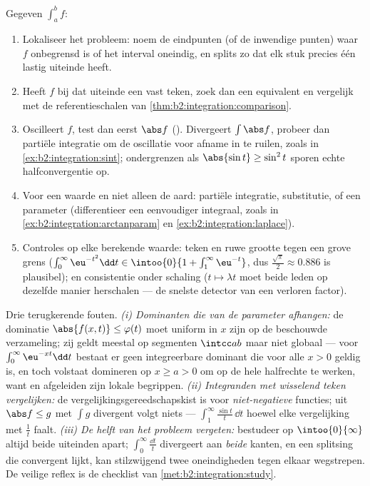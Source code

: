 \begin{method}\label{met:b2:integration:study}
Gegeven $\int_a^b f$:
\begin{enumerate}
  \item Lokaliseer het probleem: noem de eindpunten (of de
        inwendige punten) waar $f$ onbegrensd is of het interval
        oneindig, en splits zo dat elk stuk precies één lastig
        uiteinde heeft.
  \item Heeft $f$ bij dat uiteinde een vast teken, zoek dan een
        equivalent en vergelijk met de referentieschalen van
        \cref{thm:b2:integration:comparison}.
  \item Oscilleert $f$, test dan eerst $\abs f$ (). Divergeert $\int\abs f$, probeer dan
        partiële integratie om de oscillatie voor afname in te
        ruilen, zoals in \cref{ex:b2:integration:sint};
        ondergrenzen als $\abs{\sin t} \geq \sin^2t$ sporen echte
        halfconvergentie op.
  \item Voor een waarde en niet alleen de aard: partiële
        integratie, substitutie, of een parameter (differentieer
        een eenvoudiger integraal, zoals in
        \cref{ex:b2:integration:arctanparam} en
        \cref{ex:b2:integration:laplace}).
  \item Controles op elke berekende waarde: teken en ruwe grootte
        tegen een grove grens ($\int_0^\infty \eu^{-t^2}\dd t \in
        \intoo{0}{1 + \int_1^\infty \eu^{-t}}$, dus
        $\frac{\sqrt\pi}{2} \approx 0.886$ is plausibel); en
        consistentie onder schaling ($t \mapsto \lambda t$ moet
        beide leden op dezelfde manier herschalen --- de snelste
        detector van een verloren factor).
\end{enumerate}
\end{method}

\begin{remark}
Drie terugkerende fouten. \emph{(i) Dominanten die van de parameter
afhangen:} de dominatie $\abs{f(x,t)} \leq \varphi(t)$ moet uniform
in $x$ zijn op de beschouwde verzameling; zij geldt meestal op
segmenten $\intcc ab$ maar niet globaal --- voor
$\int_0^\infty\eu^{-xt}\dd t$ bestaat er geen integreerbare
dominant die voor alle $x > 0$ geldig is, en toch volstaat
domineren op $x \geq a > 0$ om op de hele  halfrechte te
werken, want  en afgeleiden zijn lokale begrippen.
\emph{(ii) Integranden met wisselend teken vergelijken:} de
vergelijkingsgereedschapskist is voor \emph{niet-negatieve}
functies; uit $\abs f \leq g$ met $\int g$ divergent volgt niets
--- $\int_1^\infty\frac{\sin t}t\,\dd t$  hoewel elke
vergelijking met $\frac1t$ faalt. \emph{(iii) De helft van het
probleem vergeten:} bestudeer op $\intoo{0}{\infty}$ altijd beide
uiteinden apart; $\int_0^\infty\frac{\dd t}{t}$ divergeert aan
\emph{beide} kanten, en een splitsing die convergent lijkt, kan
stilzwijgend twee oneindigheden tegen elkaar wegstrepen. De veilige
reflex is de checklist van \cref{met:b2:integration:study}.
\end{remark}

